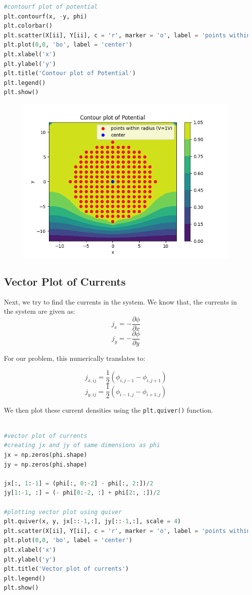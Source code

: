 \documentclass[11pt, a4paper]{article}
\begin{document}
\begin{lstlisting}[language = Python]
#contourf plot of potential
plt.contourf(x, -y, phi)
plt.colorbar()
plt.scatter(X[ii], Y[ii], c = 'r', marker = 'o', label = 'points within radius (V=1V)')
plt.plot(0,0, 'bo', label = 'center')
plt.xlabel('x')
plt.ylabel('y')
plt.title('Contour plot of Potential')
plt.legend()
plt.show()
\end{lstlisting}

\begin{figure}[H]
     \centering
     \includegraphics[scale=0.8]{Figure_8.png}
\end{figure}

\subsection{Vector Plot of Currents}
Next, we try to find the currents in the system. We know that, the currents in the system are given as:
\[j_x = - \frac{\partial \phi}{\partial x}\]
\[j_y = - \frac{\partial \phi}{\partial y}\]

For our problem, this numerically translates to:

\[j_{x,ij} = \frac{1}{2}(\phi_{i,j-1} - \phi_{i,j+1})\]
\[j_{y,ij} = \frac{1}{2}(\phi_{i-1,j} - \phi_{i+1,j})\]

We then plot these current densities using the \texttt{plt.quiver()} function.
\\
\begin{lstlisting}[language = Python]

#vector plot of currents
#creating jx and jy of same dimensions as phi
jx = np.zeros(phi.shape)
jy = np.zeros(phi.shape)

jx[:, 1:-1] = (phi[:, 0:-2] - phi[:, 2:])/2
jy[1:-1, :] = (- phi[0:-2, :] + phi[2:, :])/2

#plotting vector plot using quiver
plt.quiver(x, y, jx[::-1,:], jy[::-1,:], scale = 4)
plt.scatter(X[ii], Y[ii], c = 'r', marker = 'o', label = 'points within radius (V=1V)')
plt.plot(0,0, 'bo', label = 'center')
plt.xlabel('x')
plt.ylabel('y')
plt.title('Vector plot of currents')
plt.legend()
plt.show()

\end{lstlisting}
\end{document}
